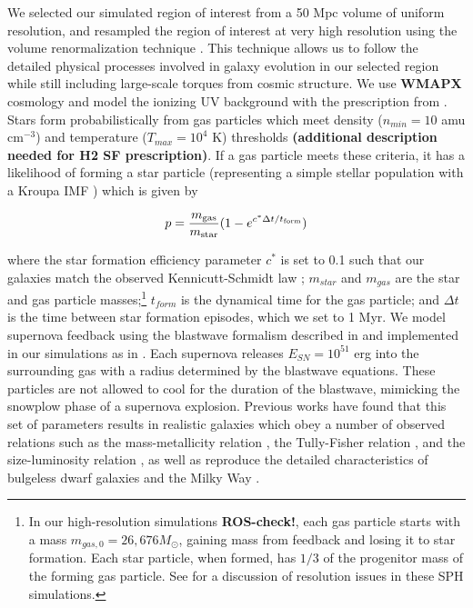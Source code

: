 \documentclass[nofootinbib,twocolumn,prd]{emulateapj}
\begin{document}
We selected our simulated region of interest from a 50 Mpc volume of
uniform resolution, and resampled the region of interest at very high
resolution using the volume renormalization technique \citep{Katz93}.
This technique allows us to follow the detailed physical processes
involved in galaxy evolution in our selected region while still
including large-scale torques from cosmic structure.  We use {\bf
WMAPX} cosmology \citep{WMAP} and model the ionizing UV background
with the prescription from \citet{Haardt96}.  Stars form
probabilistically from gas particles which meet density ($n_{min} =
10$ amu cm$^{-3}$) and temperature ($T_{max} = 10^4$ K) thresholds
{\bf (additional description needed for H2 SF prescription)}. If a gas
particle meets these criteria, it has a likelihood of forming a star
particle (representing a simple stellar population with a Kroupa IMF
\citep{Kroupa}) which is given by

\begin{equation}
p = \frac{m_{\rm gas}}{m_{\rm star}} (1 - e^{c^*\Delta t/t_{\rm form}})
\end{equation}

\noindent
where the star formation efficiency parameter $c^*$ is set to 0.1 such
that our galaxies match the observed Kennicutt-Schmidt law
\citep{Kennicutt89}; $m_{star}$ and $m_{gas}$ are the star and gas
particle masses;\footnote{In our high-resolution simulations \textbf{ROS-check!}, each gas particle starts with a mass
  $m_{gas,0}=26,676 M_\odot$, gaining mass from feedback and losing it to star formation.  Each star particle, when
  formed, has $1/3$ of the progenitor mass of the forming gas particle.  See \cite{2010ApJ...717..121C} for a discussion
of resolution issues in these SPH simulations.} $t_{form}$ is the dynamical time for the gas
particle; and $\Delta t$ is the time between star formation episodes,
which we set to 1 Myr.  We model supernova feedback using the
blastwave formalism described in \citet{McKee77} and implemented in
our simulations as in \citet{Stinson06}.  Each supernova releases
$E_{SN} = 10^{51}$ erg into the surrounding gas with a radius
determined by the blastwave equations.  These particles are not
allowed to cool for the duration of the blastwave, mimicking the
snowplow phase of a supernova explosion.  Previous works have found
that this set of parameters results in realistic galaxies which obey a
number of observed relations such as the mass-metallicity relation
\citep{Brooks07}, the Tully-Fisher relation \citep{Governato09}, and
the size-luminosity relation \citep{Brooks11}, as well as reproduce
the detailed characteristics of bulgeless dwarf galaxies
\citep{Governato10} and the Milky Way \citep{Guedes11}.
\end{document}
